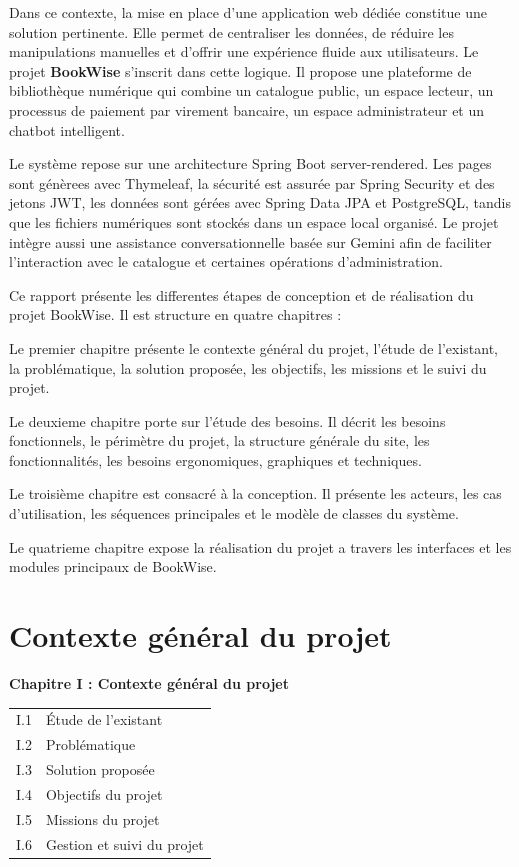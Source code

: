 \documentclass[12pt,a4paper]{report}
\begin{document}
Dans ce contexte, la mise en place d'une application web dédiée constitue une solution pertinente. Elle permet de centraliser les données, de réduire les manipulations manuelles et d'offrir une expérience fluide aux utilisateurs. Le projet \textbf{BookWise} s'inscrit dans cette logique. Il propose une plateforme de bibliothèque numérique qui combine un catalogue public, un espace lecteur, un processus de paiement par virement bancaire, un espace administrateur et un chatbot intelligent.

Le système repose sur une architecture Spring Boot server-rendered. Les pages sont génèrees avec Thymeleaf, la sécurité est assurée par Spring Security et des jetons JWT, les données sont gérées avec Spring Data JPA et PostgreSQL, tandis que les fichiers numériques sont stockés dans un espace local organisé. Le projet intègre aussi une assistance conversationnelle basée sur Gemini afin de faciliter l'interaction avec le catalogue et certaines opérations d'administration.

Ce rapport présente les differentes étapes de conception et de réalisation du projet BookWise. Il est structure en quatre chapitres :

Le premier chapitre présente le contexte général du projet, l'étude de l'existant, la problématique, la solution proposée, les objectifs, les missions et le suivi du projet.

Le deuxieme chapitre porte sur l'étude des besoins. Il décrit les besoins fonctionnels, le périmètre du projet, la structure générale du site, les fonctionnalités, les besoins ergonomiques, graphiques et techniques.

Le troisième chapitre est consacré à la conception. Il présente les acteurs, les cas d'utilisation, les séquences principales et le modèle de classes du système.

Le quatrieme chapitre expose la réalisation du projet a travers les interfaces et les modules principaux de BookWise.

\chapter{Contexte général du projet}

\begin{center}
    \vspace*{0.25cm}
    \Large\textbf{Chapitre I : Contexte général du projet}
    \vspace{0.55cm}

    \begin{tabular}{ll}
        I.1 & Étude de l'existant\\
        I.2 & Problématique\\
        I.3 & Solution proposée\\
        I.4 & Objectifs du projet\\
        I.5 & Missions du projet\\
        I.6 & Gestion et suivi du projet
    \end{tabular}
\end{center}
\end{document}
